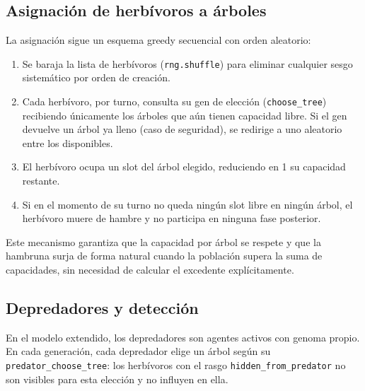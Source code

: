 \documentclass[11pt,a4paper]{article}
\begin{document}
\subsection{Asignaci\'on de herb\'ivoros a \'arboles}

La asignaci\'on sigue un esquema greedy secuencial con orden aleatorio:
\begin{enumerate}
	\item Se baraja la lista de herb\'ivoros (\texttt{rng.shuffle}) para eliminar cualquier sesgo
	sistem\'atico por orden de creaci\'on.
	\item Cada herb\'ivoro, por turno, consulta su gen de elecci\'on (\texttt{choose\_tree})
	recibiendo \'unicamente los \'arboles que a\'un tienen capacidad libre.
	Si el gen devuelve un \'arbol ya lleno (caso de seguridad), se redirige a uno aleatorio
	entre los disponibles.
	\item El herb\'ivoro ocupa un slot del \'arbol elegido, reduciendo en 1 su capacidad
	restante.
	\item Si en el momento de su turno no queda ning\'un slot libre en ning\'un \'arbol,
	el herb\'ivoro muere de hambre y no participa en ninguna fase posterior.
\end{enumerate}

Este mecanismo garantiza que la capacidad por \'arbol se respete y que la hambruna surja de forma natural cuando la poblaci\'on supera la suma de capacidades, sin necesidad de calcular el excedente expl\'icitamente.

\subsection{Depredadores y detecci\'on}\label{subsec:pred}

En el modelo extendido, los depredadores son agentes activos con genoma propio. En cada generaci\'on, cada
depredador elige un \'arbol seg\'un su \texttt{predator\_choose\_tree}: los herb\'ivoros con el rasgo
\texttt{hidden\_from\_predator} no son visibles para esta elecci\'on y no influyen en ella.
\end{document}
